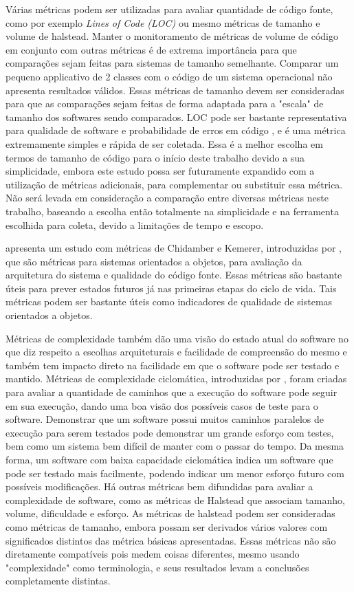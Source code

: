Várias métricas podem ser utilizadas para avaliar quantidade de código fonte, como por exemplo \textit{Lines of Code (LOC)} ou mesmo métricas de tamanho e volume de halstead. Manter o monitoramento de métricas de volume de código em conjunto com outras métricas é de extrema importância para que comparações sejam feitas para sistemas de tamanho semelhante. Comparar um pequeno applicativo de 2 classes com o código de um sistema operacional não apresenta resultados válidos. Essas métricas de tamanho devem ser consideradas para que as comparações sejam feitas de forma adaptada para a "escala" de tamanho dos softwares sendo comparados. LOC pode ser bastante representativa para qualidade de software e probabilidade de erros em código \cite{validationmetricsfaultprediction}, e é uma métrica extremamente simples e rápida de ser coletada. Essa é a melhor escolha em termos de tamanho de código para o início deste trabalho devido a sua simplicidade, embora este estudo possa ser futuramente expandido com a utilização de métricas adicionais, para complementar ou substituir essa métrica. Não será levada em consideração a comparação entre diversas métricas neste trabalho, baseando a escolha então totalmente na simplicidade e na ferramenta escolhida para coleta, devido a limitações de tempo e escopo.

 apresenta um estudo com métricas de Chidamber e Kemerer, introduzidas por , que são métricas para sistemas orientados a objetos, para avaliação da arquitetura do sistema e qualidade do código fonte. Essas métricas são bastante úteis para prever estados futuros já nas primeiras etapas do ciclo de vida. Tais métricas podem ser bastante úteis como indicadores de qualidade de sistemas orientados a objetos\cite{ooasqualityindicators}. 

Métricas de complexidade também dão uma visão do estado atual do software no que diz respeito a escolhas arquiteturais e facilidade de compreensão do mesmo e também tem impacto direto na facilidade em que o software pode ser testado e mantido. Métricas de complexidade ciclomática, introduzidas por , foram criadas para avaliar a quantidade de caminhos que a execução do software pode seguir em sua execução, dando uma boa visão dos possíveis casos de teste para o software. Demonstrar que um software possui muitos caminhos paralelos de execução para serem testados pode demonstrar um grande esforço com testes, bem como um sistema bem difícil de manter com o passar do tempo. Da mesma forma, um software com baixa capacidade ciclomática indica um software que pode ser testado mais facilmente, podendo indicar um menor esforço futuro com possíveis modificações. Há outras métricas bem difundidas para avaliar a complexidade de software, como as métricas de Halstead que associam tamanho, volume, dificuldade e esforço. As métricas de halstead podem ser consideradas como métricas de tamanho, embora possam ser derivados vários valores com significados distintos das métrica básicas apresentadas. Essas métricas não são diretamente compatíveis pois medem coisas diferentes, mesmo usando "complexidade" como terminologia, e seus resultados levam a conclusões completamente distintas.

